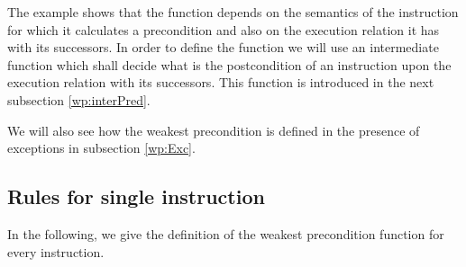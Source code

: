 The example shows that the function \fwpi{} depends  on the semantics of the instruction 
for which it calculates a precondition and also on the execution relation it has with its successors.
In order to define the function \fwpi{} we will use an intermediate function which shall decide 
what is the postcondition of an instruction  upon the execution relation with its successors. This function 
is introduced in the next subsection \ref{wp:interPred}.
 
We will also see how the weakest precondition is defined in the presence of exceptions in subsection \ref{wp:Exc}.

 



\subsection{Rules for single instruction} \label{wp:singleInstr}
 In the following, we give the definition of the weakest precondition function for every instruction.


